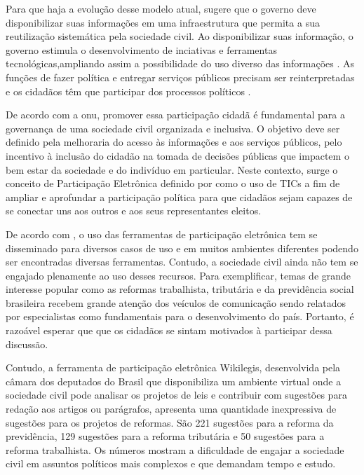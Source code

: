 \par
Para que haja a evolução desse modelo atual,  sugere que o governo deve disponibilizar suas informações em uma infraestrutura que permita a sua reutilização sistemática pela sociedade civil. Ao disponibilizar suas informação, o governo estimula o desenvolvimento de inciativas e ferramentas tecnológicas,ampliando assim a possibilidade do uso diverso das informações \cite{zuiderwijk2012socio}. As funções de fazer política e entregar serviços públicos precisam ser reinterpretadas e os cidadãos têm que participar dos processos políticos \cite{bovaird2007beyond}.
\par
De acordo com a \acrshort{onu}, promover essa participação cidadã é fundamental para a governança de uma sociedade civil organizada e inclusiva. O objetivo deve ser definido pela melhoraria do acesso às informações e aos serviços públicos, pelo incentivo à inclusão do cidadão na tomada de decisões públicas que impactem o bem estar da sociedade e do indivíduo em particular.  Neste contexto, surge o conceito de Participação Eletrônica definido por  como o uso de TICs a fim de ampliar e aprofundar a participação política para que cidadãos sejam capazes de se conectar uns aos outros e aos seus representantes eleitos. 

De acordo com \cite{medeiros2009novos}, o uso das ferramentas de participação eletrônica tem se disseminado para diversos casos de uso e em muitos ambientes diferentes podendo ser encontradas diversas ferramentas. Contudo, a sociedade civil ainda não tem se engajado plenamente ao uso desses recursos. Para exemplificar, temas de grande interesse popular como as reformas trabalhista, tributária e da previdência social brasileira recebem grande atenção dos veículos de comunicação sendo relatados por especialistas como fundamentais para o desenvolvimento do país. Portanto, é razoável esperar que que os cidadãos se sintam motivados à participar dessa discussão. 

\par
Contudo, a ferramenta de participação eletrônica Wikilegis, desenvolvida pela câmara dos deputados do Brasil que disponibiliza um ambiente virtual onde a sociedade civil pode analisar os projetos de leis e contribuir com sugestões para redação aos artigos ou parágrafos, apresenta uma quantidade inexpressiva de sugestões para os projetos de reformas. São 221 sugestões para a reforma da previdência, 129 sugestões para a reforma tributária e  50 sugestões para a reforma trabalhista.  Os números mostram a dificuldade de engajar a sociedade civil em assuntos políticos mais complexos e que demandam tempo e estudo.

